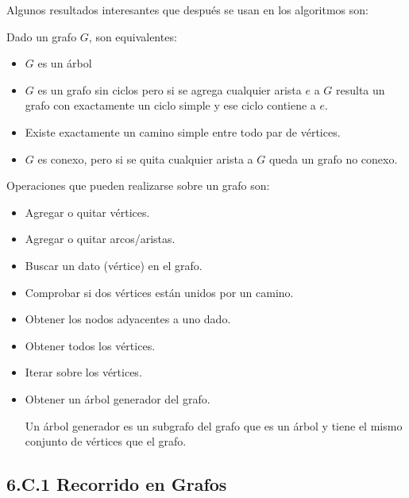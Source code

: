 \begin{itemize}
Algunos resultados interesantes que después se usan en los algoritmos son:

Dado un grafo $G$, son equivalentes:
\begin{itemize}
\item
$G$ es un árbol

\item
$G$ es un grafo sin ciclos pero si se agrega cualquier arista $e$ a $G$ resulta un grafo con exactamente un ciclo simple y ese ciclo contiene a $e$.

\item Existe exactamente un camino simple entre todo par de vértices.

\item $G$ es conexo, pero si se quita cualquier arista a $G$ queda un grafo no conexo.
\end{itemize}

\end{itemize}

Operaciones que pueden realizarse sobre un grafo son:

\begin{itemize}
\item Agregar o quitar vértices.
\item Agregar o quitar arcos/aristas.
\item Buscar un dato (vértice) en el grafo.
\item Comprobar si dos vértices están unidos por un camino.
\item Obtener los nodos adyacentes a uno dado.
\item Obtener todos los vértices.
\item Iterar sobre los vértices.
\item Obtener un árbol generador del grafo.

Un árbol generador es un subgrafo del grafo que es un árbol y tiene el mismo conjunto de vértices que el grafo. 
\end{itemize}




\subsection*{6.C.1 Recorrido en Grafos}
\label{sec:RecorridoGrafo}

